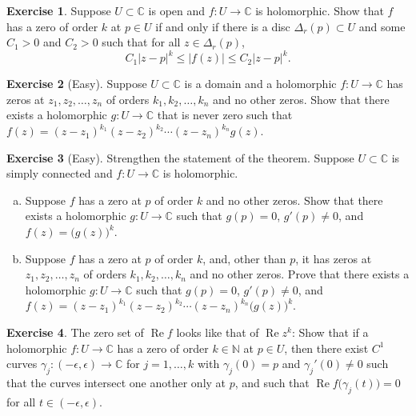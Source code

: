 \documentclass[12pt,openany]{book}
\renewcommand{\Re}{\operatorname{Re}}
\newcommand{\sabs}[1]{\lvert {#1} \rvert}
\newcommand{\C}{{\mathbb{C}}}
\newcommand{\N}{{\mathbb{N}}}
\theoremstyle{plain}
\theoremstyle{remark}
\theoremstyle{definition}
\newenvironment{exbox}{%
    \def\FrameCommand{\vrule width 1pt \relax\hspace{10pt}}%
    \MakeFramed{\advance\hsize-\width\FrameRestore}%
}{%
    \endMakeFramed
}
\newenvironment{exparts}{%
    \leavevmode\begin{enumerate}[a),noitemsep,topsep=0pt,parsep=0pt,partopsep=0pt]
}{%
    \end{enumerate}
}
\theoremstyle{exercise}
\newtheorem{exercise}{Exercise}[section]
\theoremstyle{example}
\begin{document}
\begin{exbox}
\begin{exercise}%
\label{exercise:order}
Suppose $U \subset \C$ is open and
$f \colon U \to \C$ is holomorphic.
Show that $f$ has a zero of order $k$ at $p \in U$
if and only if
there is a disc $\Delta_r(p) \subset U$ and some $C_1 > 0$ and $C_2 > 0$
such that for
all $z \in \Delta_r(p)$,
\begin{equation*}
C_1 {\sabs{z-p}}^k
\leq
\sabs{f(z)}
\leq
C_2 {\sabs{z-p}}^k .
\end{equation*}
\end{exercise}

\begin{exercise}[Easy]
Suppose $U \subset \C$ is a domain and a holomorphic $f \colon U \to \C$ 
has zeros at $z_1, z_2, \ldots, z_n$ of
orders $k_1, k_2, \ldots, k_n$ and no other zeros.
Show that there exists a holomorphic
$g \colon U \to \C$ that is never zero
such that $f(z) = {(z-z_1)}^{k_1}{(z-z_2)}^{k_2}\cdots{(z-z_n)}^{k_n} g(z).$
\end{exercise}

\begin{exercise}[Easy]
\pagebreak[2]
Strengthen the statement of the theorem.
Suppose $U \subset \C$ is simply connected and $f \colon U \to \C$
is holomorphic.
\begin{exparts}
\item
Suppose $f$ has a zero at $p$ of
order $k$ and no other zeros.
Show that there exists a holomorphic
$g \colon U \to \C$ such that $g(p) = 0$, $g'(p) \neq 0$, and
$f(z) = {\bigl( g(z) \bigr)}^k$.
\item
Suppose $f$ has a zero at $p$
of order $k$,
and, other than $p$, it has zeros at $z_1, z_2, \ldots, z_n$ of
orders $k_1, k_2, \ldots, k_n$ and no other zeros.
Prove that there exists a holomorphic
$g \colon U \to \C$ such that $g(p) = 0$, $g'(p) \neq 0$,
and
$f(z) = {(z-z_1)}^{k_1}{(z-z_2)}^{k_2}\cdots{(z-z_n)}^{k_n}
{\bigl( g(z) \bigr)}^k$.
\end{exparts}
\end{exercise}

\begin{exercise}
The zero set of $\Re f$ looks like that of $\Re z^k$:
Show that if a holomorphic $f \colon U \to \C$
has a zero of order $k \in \N$ at $p \in
U$, then there exist $C^1$ curves
$\gamma_j \colon (-\epsilon, \epsilon) \to \C$ for
$j=1,\ldots,k$ with $\gamma_j(0) = p$
and $\gamma_j'(0) \neq 0$ such that the curves intersect
one another
only at $p$, and such that $\Re f\bigl( \gamma_j(t) \bigr) = 0$ for
all $t \in (-\epsilon,\epsilon)$.
\end{exercise}


\end{exbox}
\end{document}
